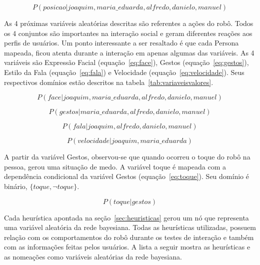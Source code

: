 \begin{equation}
	\label{eq:posicao}
	P(posicao | joaquim, maria\_eduarda, alfredo, danielo, manuel)
\end{equation}

As 4 próximas variáveis aleatórias descritas são referentes a ações do robô. Todos os 4 conjuntos são importantes na interação social e geram diferentes reações aos perfis de usuários. Um ponto interessante a ser resaltado é que cada Persona mapeada, ficou atenta durante a interação em apenas algumas das variáveis. As 4 variáveis são Expressão Facial (equação~\ref{eq:face}), Gestos (equação~\ref{eq:gestos}), Estilo da Fala (equação~\ref{eq:fala}) e Velocidade (equação~\ref{eq:velocidade}). Seus respectivos domínios estão descritos na tabela~\ref{tab:variaveisvalores}.

\begin{equation}
	\label{eq:face}
	P(face | joaquim, maria\_eduarda, alfredo, danielo, manuel)
\end{equation}

\begin{equation}
	\label{eq:gestos}
	P(gestos | maria\_eduarda, alfredo, danielo, manuel)
\end{equation}

\begin{equation}
	\label{eq:fala}
	P(fala | joaquim, alfredo, danielo, manuel)
\end{equation}

\begin{equation}
	\label{eq:velocidade}
	P(velocidade | joaquim, maria\_eduarda)
\end{equation}

A partir da variável Gestos, observou-se que quando ocorreu o toque do robô na pessoa, gerou uma situação de medo. A variável toque é mapeada com a dependência condicional da variável Gestos (equação~\ref{eq:toque}). Seu domínio é binário, $\{toque, \neg toque\}$.

\begin{equation}
	\label{eq:toque}
	P(toque | gestos)
\end{equation}

Cada heurística apontada na seção~\ref{sec:heuristicas} gerou um nó que representa uma variável aleatória da rede bayesiana. Todas as heurísticas utilizadas, possuem relação com os comportamentos do robô durante os testes de interação e também com as informações feitas pelos usuários. A lista a seguir mostra as heurísticas e as nomeações como variáveis aleatórias da rede bayesiana.

